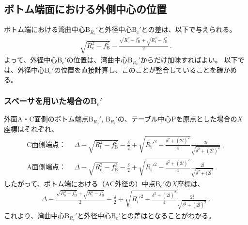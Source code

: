 \subsection{ボトム端面における外側中心の位置}
ボトム端における湾曲中心B$_{R_\mathrm c}'$と外径中心B$_\mathrm c'$との差は、以下で与えられる。
\begin{align}
  \label{eq:BRc-Bc}
  \sqrt{R_\mathrm c^2-f_\mathrm B^2}
  -\frac{\sqrt{R_\mathrm o^2-f_\mathrm B^2}+\sqrt{R_\mathrm i^2-f_\mathrm B^2}}2\ .
\end{align}
よって、外径中心B$_\mathrm c'$の位置は、湾曲中心B$_{R_\mathrm c}'$からだけ加味すればよい。
以下では、外径中心B$_\mathrm c'$の位置を直接計算し、このことが整合していることを確かめる。


\subsubsection{スペーサを用いた場合のB\texorpdfstring{$_\mathrm c'$}{c'}}
外面A・C面側のボトム端点B$_{R_\mathrm o}'$, B$_{R_\mathrm i}'$の、テーブル中心Pを原点とした場合の$X$座標はそれぞれ、
\begin{align*}
  \text{C面側端点：}&~~
  \varDelta-\sqrt{R_\mathrm i^2-f_\mathrm B^2}-\frac\delta2+\sqrt{R_\mathrm i'^2-\frac{\delta^2+(2\bar l)^2}4}\frac{2\bar l}{\sqrt{\delta^2+(2\bar l)^2}}\ ,\\
  \text{A面側端点：}&~~
  \varDelta-\sqrt{R_\mathrm o^2-f_\mathrm B^2}-\frac\delta2+\sqrt{R_\mathrm i'^2-\frac{\delta^2+(2\bar l)^2}4}\frac{2\bar l}{\sqrt{\delta^2+(2\bar l^2}}\ .
\end{align*}
したがって、ボトム端における（AC外径の）中点B$_\mathrm c'$の$X$座標は、
\begin{align}
  \label{eq:spacerBc}
  \varDelta-\frac{\sqrt{R_\mathrm o^2-f_\mathrm B^2}+\sqrt{R_\mathrm i^2-f_\mathrm B^2}}2
  -\frac\delta2+\sqrt{R_\mathrm i'^2-\frac{\delta^2+(2\bar l)^2}4}\frac{2\bar l}{\sqrt{\delta^2+(2\bar l)^2}}\ .
\end{align}
これより、湾曲中心B$_{R_\mathrm c}'$と外径中心B$_\mathrm c'$との差はとなることがわかる。


